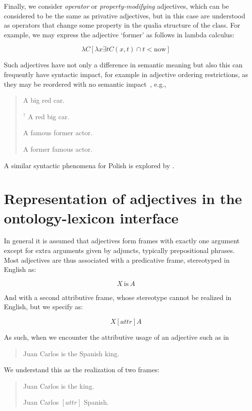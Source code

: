 \documentclass[11pt]{article}
\begin{document}
Finally, we consider \emph{operator} or \emph{property-modifying} adjectives, which can be considered to be the same as privative adjectives, but in this case are understood as operators that change some property in the qualia structure of the class. For example, we may express the adjective `former' as follows in lambda calculus\cite{}:

$$\lambda C [\lambda x \exists t C(x,t) \cap t < \mathrm{now}]$$

Such adjectives have not only a difference in semantic meaning but also this can frequently have syntactic impact, for example in adjective ordering restrictions, as they may be reordered with no semantic impact~\cite{teodorescu2006adjective}, e.g.,

\begin{quote}
A big red car.

$^?$ A red big car.

A famous former actor.

A former famous actor.
\end{quote}

A similar syntactic phenomena for Polish is explored by \cite{partee}.

\section{Representation of adjectives in the ontology-lexicon interface}

In general it is assumed that adjectives form frames with exactly one argument except for extra arguments given by adjuncts, typically prepositional phrases. Most adjectives are thus associated with a predicative frame, stereotyped in English as:

$$X\mathrm{~is~}A$$

And with a second attributive frame, whose stereotype cannot be realized in English, but we specify as:

$$X [attr] A$$

As such, when we encounter the attributive usage of an adjective such as in

\begin{quote}
Juan Carlos is the Spanish king.
\end{quote}

We understand this as the realization of two frames:

\begin{quote}
Juan Carlos is the king.

Juan Carlos $[attr]$ Spanish.
\end{quote}
\end{document}
